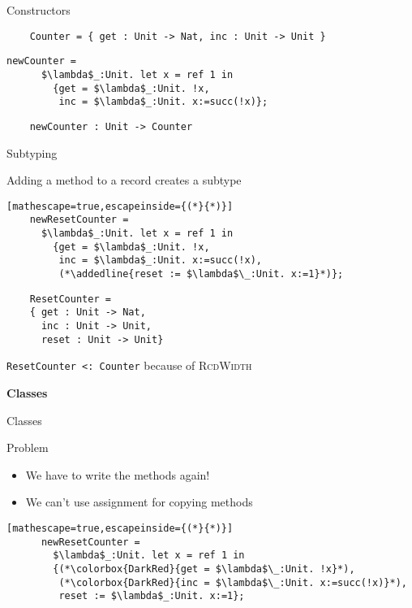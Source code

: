 \documentclass[presentation,xcolor=svgnames]{beamer}
\newcommand{\sectionframe}[1]{
  \begin{frame}
    \centering
    \huge \usebeamercolor[fg]{structure} \textbf{#1}
  \end{frame}
}
\begin{document}
\begin{frame}[fragile]{Constructors}
  \begin{lstlisting}
    Counter = { get : Unit -> Nat, inc : Unit -> Unit }
  \end{lstlisting}

  \begin{lstlisting}[mathescape=true]
    newCounter =
      $\lambda$_:Unit. let x = ref 1 in
        {get = $\lambda$_:Unit. !x,
         inc = $\lambda$_:Unit. x:=succ(!x)};
  \end{lstlisting}

  \begin{lstlisting}
    newCounter : Unit -> Counter
  \end{lstlisting}
\end{frame}


\newcommand{\addedline}[1]{\colorbox{ForestGreen}{\texttt{#1}}}

\begin{frame}[fragile]{Subtyping}
  \begin{block}{Adding a method to a record creates a subtype}
  \begin{lstlisting}[mathescape=true,escapeinside={(*}{*)}]
    newResetCounter =
      $\lambda$_:Unit. let x = ref 1 in
        {get = $\lambda$_:Unit. !x,
         inc = $\lambda$_:Unit. x:=succ(!x),
         (*\addedline{reset := $\lambda$\_:Unit. x:=1}*)};
  \end{lstlisting}
  \end{block}

  \begin{lstlisting}
    ResetCounter =
    { get : Unit -> Nat,
      inc : Unit -> Unit,
      reset : Unit -> Unit}
  \end{lstlisting}

  \texttt{ResetCounter <: Counter} because of \textsc{RcdWidth}

\end{frame}

\sectionframe{Classes}

\begin{frame}[fragile]{Classes}
  \begin{block}{Problem}
    \begin{itemize}
    \item We have to write the methods again!
    \item We can't use assignment for copying methods
    \end{itemize}
    \begin{lstlisting}[mathescape=true,escapeinside={(*}{*)}]
      newResetCounter =
        $\lambda$_:Unit. let x = ref 1 in
        {(*\colorbox{DarkRed}{get = $\lambda$\_:Unit. !x}*),
         (*\colorbox{DarkRed}{inc = $\lambda$\_:Unit. x:=succ(!x)}*),
         reset := $\lambda$_:Unit. x:=1};
    \end{lstlisting}
  \end{block}
\end{frame}
\end{document}

